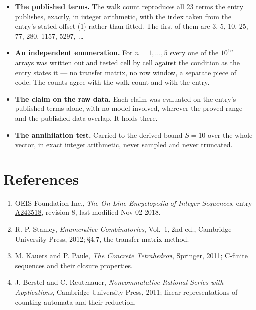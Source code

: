 \documentclass[11pt]{article}
\theoremstyle{definition}
\begin{document}
\begin{itemize}

\item {\bfseries The published terms.} The walk count reproduces all 23 terms the entry publishes, exactly, in integer arithmetic, with the index taken from the entry's stated offset (1) rather than fitted. The first of them are 3, 5, 10, 25, 77, 280, 1157, 5297,~\dots

\item {\bfseries An independent enumeration.} For $n = 1,\dots,5$ every one of the $10^{1n}$ arrays was written out and tested cell by cell against the condition as the entry states it --- no transfer matrix, no row window, a separate piece of code. The counts agree with the walk count and with the entry.

\item {\bfseries The claim on the raw data.} Each claim was evaluated on the entry's published terms alone, with no model involved, wherever the proved range and the published data overlap. It holds there.

\item {\bfseries The annihilation test.} Carried to the derived bound $S = 10$ over the whole vector, in exact integer arithmetic, never sampled and never truncated.

\end{itemize}

\section{References}

\begin{enumerate}

\item OEIS Foundation Inc., \emph{The On-Line Encyclopedia of Integer Sequences}, entry \href{https://oeis.org/A243518}{A243518}, revision 8, last modified Nov 02 2018.

\item R. P. Stanley, \emph{Enumerative Combinatorics}, Vol.~1, 2nd ed., Cambridge University Press, 2012; \S4.7, the transfer-matrix method.

\item M. Kauers and P. Paule, \emph{The Concrete Tetrahedron}, Springer, 2011; C-finite sequences and their closure properties.

\item J. Berstel and C. Reutenauer, \emph{Noncommutative Rational Series with Applications}, Cambridge University Press, 2011; linear representations of counting automata and their reduction.

\end{enumerate}
\end{document}

